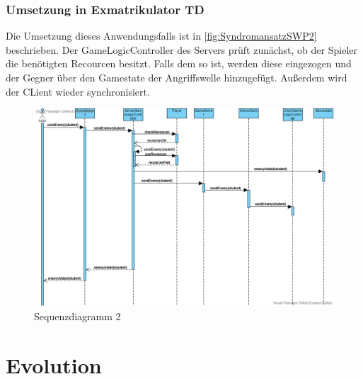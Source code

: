 \documentclass[enabledeprecatedfontcommands,fontsize=12pt,paper=a4,twoside,parskip=half]{scrartcl}
\begin{document}
\subsubsection{Umsetzung in Exmatrikulator TD}

Die Umsetzung dieses Anwendungsfalls ist in \autoref{fig:SyndromansatzSWP2} beschrieben.
Der GameLogicController des Servers prüft zunächst, ob der Spieler die benötigten Recourcen besitzt. Falls dem so ist, werden diese eingezogen und der Gegner über den Gamestate der Angriffswelle hinzugefügt. Außerdem wird der CLient wieder synchronisiert.

\begin{figure}[H]
    \centering
    \includegraphics[width=\textwidth]{Bilder/sequence_send_wave.png}
    \caption{Sequenzdiagramm 2}
    \label{fig:SyndromansatzSWP2}
\end{figure}
\newpage



\section{Evolution}

\label{sec:evolution}
\end{document}
